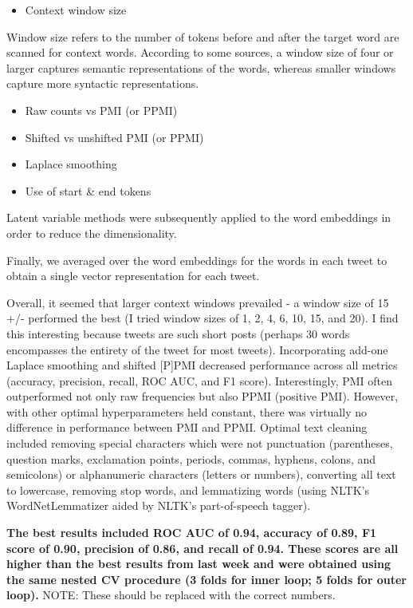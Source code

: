 \documentclass{article}
\begin{document}
\begin{itemize}
\tightlist
\item
  Context window size
\end{itemize}

Window size refers to the number of tokens before and after the target
word are scanned for context words. According to some sources, a window
size of four or larger captures semantic representations of the words,
whereas smaller windows capture more syntactic representations.

\begin{itemize}
\tightlist
\item
  Raw counts vs PMI (or PPMI)
\item
  Shifted vs unshifted PMI (or PPMI)
\item
  Laplace smoothing
\item
  Use of start \& end tokens
\end{itemize}

Latent variable methods were subsequently applied to the word embeddings
in order to reduce the dimensionality.

Finally, we averaged over the word embeddings for the words in each
tweet to obtain a single vector representation for each tweet.

Overall, it seemed that larger context windows prevailed - a window size
of 15 +/- performed the best (I tried window sizes of 1, 2, 4, 6, 10,
15, and 20). I find this interesting because tweets are such short posts
(perhaps 30 words encompasses the entirety of the tweet for most
tweets). Incorporating add-one Laplace smoothing and shifted {[}P{]}PMI
decreased performance across all metrics (accuracy, precision, recall,
ROC AUC, and F1 score). Interestingly, PMI often outperformed not only
raw frequencies but also PPMI (positive PMI). However, with other
optimal hyperparameters held constant, there was virtually no difference
in performance between PMI and PPMI. Optimal text cleaning included
removing special characters which were not punctuation (parentheses,
question marks, exclamation points, periods, commas, hyphens, colons,
and semicolons) or alphanumeric characters (letters or numbers),
converting all text to lowercase, removing stop words, and lemmatizing
words (using NLTK's WordNetLemmatizer aided by NLTK's part-of-speech
tagger).

\textbf{The best results included ROC AUC of 0.94, accuracy of 0.89, F1
score of 0.90, precision of 0.86, and recall of 0.94. These scores are
all higher than the best results from last week and were obtained using
the same nested CV procedure (3 folds for inner loop; 5 folds for outer
loop).} NOTE: These should be replaced with the correct numbers.
\end{document}
